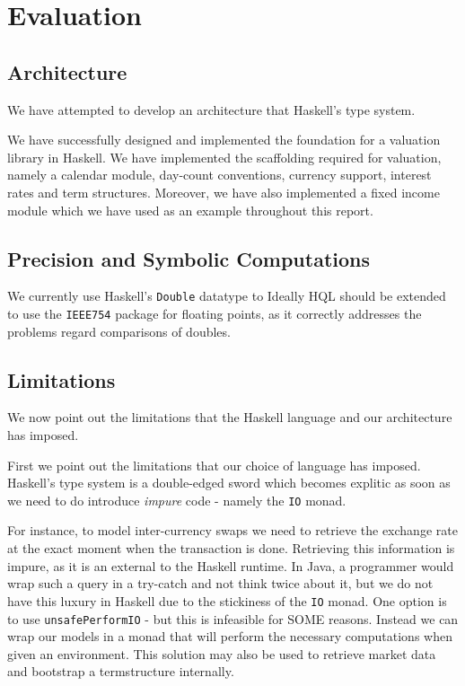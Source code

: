 \chapter{Evaluation}

\section{Architecture}

We have attempted to develop an architecture that Haskell's type system.

We have successfully designed and implemented the foundation for a valuation 
library in Haskell. We have implemented the scaffolding required for valuation, 
namely a calendar module, day-count conventions, currency support, interest 
rates and term structures. Moreover, we have also implemented a fixed income 
module which we have used as an example throughout this report.

\section{Precision and Symbolic Computations}

We currently use Haskell’s \texttt{Double} datatype to 
Ideally HQL should be extended to use the \texttt{IEEE754} package for floating 
points, as it correctly addresses the problems regard comparisons of doubles.

\section{Limitations}

We now point out the limitations that the Haskell language and our architecture 
has imposed.

First we point out the limitations that our choice of language has imposed.
Haskell’s type system is a double-edged sword which becomes explitic as soon 
as we need to do introduce \emph{impure} code - namely the \texttt{IO} monad.

For instance, to model inter-currency swaps we need to retrieve the exchange 
rate at the exact moment when the transaction is done. Retrieving this 
information is impure, as it is an external to the Haskell runtime. In Java, a 
programmer would wrap such a query in a try-catch and not think twice about it, 
but we do not have this luxury in Haskell due to the stickiness of the 
\texttt{IO} monad. One option is to use \texttt{unsafePerformIO} - but this is 
infeasible for SOME reasons.
Instead we can wrap our models in a monad that will perform the necessary 
computations when given an environment. This solution may also be used to 
retrieve market data and bootstrap a termstructure internally.

